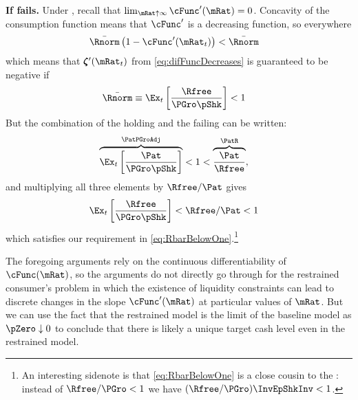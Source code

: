 \documentclass[BufferStockTheory]{subfiles}
\begin{document}
\textbf{If {\RIC} fails.}
Under \cncl{\RIC}, recall that $\lim_{\mRat \uparrow \infty} \cFunc^{\prime}(\mRat) = 0$.  Concavity of the consumption function means that $\cFunc^{\prime}$ is a decreasing function, so everywhere 
\begin{align*}
  \bar{\Rnorm}\left(1-\cFunc^{\prime}({\mRat}_t)\right) & < \bar{\Rnorm}
\end{align*}
which means that $\difFunc^{\prime}(\mRat_{t})$ from \eqref{eq:difFuncDecreases} is guaranteed to be negative if
\begin{align}
  \bar{\Rnorm} \equiv \Ex_{t}\left[\frac{\Rfree}{\PGro \pShk}\right] & < 1  \label{eq:RbarBelowOne}
\end{align}
But the combination of the {\GIC} holding and the {\RIC} failing can be written:
\begin{align*}
  \overbrace{\Ex_{t}\left[\frac{\Pat}{\PGro \pShk}\right]}^{\PatPGroAdj} & < 1 < \overbrace{\frac{\Pat}{\Rfree}}^{{\PatR}},
\end{align*}
and multiplying all three elements by $\Rfree/\Pat$ gives 
\begin{align*}
  \Ex_{t}\left[\frac{\Rfree}{\PGro \pShk}\right] & < \Rfree/\Pat < 1
\end{align*}
which satisfies our requirement in \eqref{eq:RbarBelowOne}.\footnote{An interesting sidenote is that \eqref{eq:RbarBelowOne} is a close cousin to the {\FHWC}: instead of $\Rfree/\PGro < 1$ we have $(\Rfree/\PGro)\InvEpShkInv < 1$.}



The foregoing arguments rely on the continuous differentiability of
$\cFunc(\mRat)$, so the arguments do not directly go through for the
restrained consumer's problem in which the existence of liquidity
constraints can lead to discrete changes in the slope
$\cFunc^{\prime}(\mRat)$ at particular values of $\mRat$. But we can
use the fact that the restrained model is the limit of the baseline
model as $\pZero \downarrow 0$ to conclude that there is likely a
unique target cash level even in the restrained model.
\end{document}
